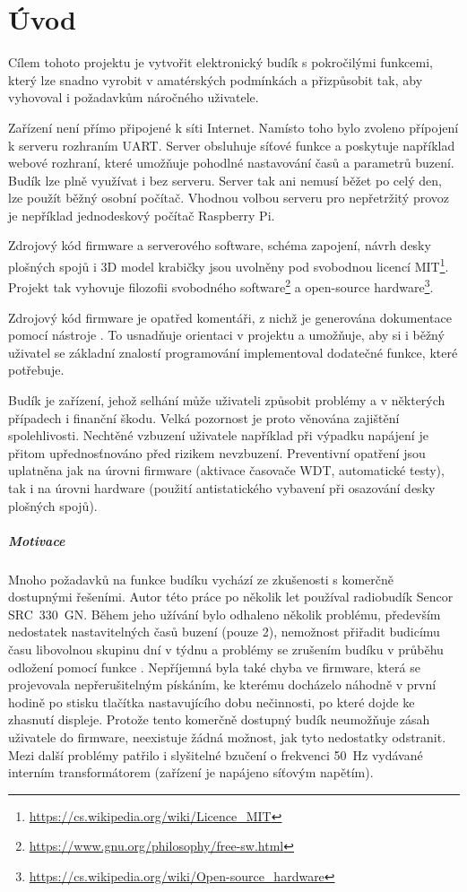 \chapter{Úvod}
Cílem tohoto projektu je vytvořit elektronický budík s pokročilými funkcemi,
který lze snadno vyrobit v amatérských podmínkách a přizpůsobit tak, aby
vyhovoval i požadavkům náročného uživatele.

Zařízení není přímo připojené k síti Internet. Namísto toho bylo zvoleno
přípojení k serveru rozhraním UART. Server obsluhuje síťové funkce a poskytuje
například webové rozhraní, které umožňuje pohodlné nastavování časů a parametrů
buzení. Budík lze plně využívat i bez serveru. Server tak ani nemusí běžet po
celý den, lze použít běžný osobní počítač. Vhodnou volbou serveru pro
nepřetržitý provoz je nepříklad jednodeskový počítač Raspberry Pi.

Zdrojový kód firmware a serverového software, schéma zapojení, návrh desky
plošných spojů i 3D model krabičky jsou uvolněny pod svobodnou
licencí MIT\footnote{\url{https://cs.wikipedia.org/wiki/Licence_MIT}}.
Projekt tak vyhovuje filozofii svobodného
software\footnote{\url{https://www.gnu.org/philosophy/free-sw.html}}
a open-source
hardware\footnote{\url{https://cs.wikipedia.org/wiki/Open-source_hardware}}.

Zdrojový kód firmware je opatřed komentáři, z nichž je generována dokumentace
pomocí nástroje . To usnadňuje orientaci v projektu
a umožňuje, aby si i běžný uživatel se základní znalostí programování
implementoval dodatečné funkce, které potřebuje.

Budík je zařízení, jehož selhání může uživateli způsobit problémy a v některých
případech i finanční škodu. Velká pozornost je proto věnována zajištění
spolehlivosti. Nechtěné vzbuzení uživatele například při výpadku napájení je
přitom upřednosťnováno před rizikem nevzbuzení. Preventivní opatření jsou
uplatněna jak na úrovni firmware (aktivace časovače \acs{WDT}, automatické
testy), tak i na úrovni hardware (použití antistatického vybavení při osazování
desky plošných spojů).

\paragraph{Motivace}
Mnoho požadavků na funkce budíku vychází ze zkušenosti s komerčně dostupnými
řešeními. Autor této práce po několik let používal radiobudík Sencor
SRC~330~GN. Během jeho užívání bylo odhaleno několik problému, především
nedostatek nastavitelných časů buzení (pouze 2), nemožnost přiřadit budicímu
času libovolnou skupinu dní v týdnu a problémy se zrušením budíku v průběhu
odložení pomocí funkce . Nepříjemná byla také chyba ve firmware,
která se projevovala nepřerušitelným pískáním, ke kterému docházelo náhodně
v první hodině po stisku tlačítka nastavujícího dobu nečinnosti, po které dojde
ke zhasnutí displeje. Protože tento komerčně dostupný budík neumožňuje zásah
uživatele do firmware, neexistuje žádná možnost, jak tyto nedostatky odstranit.
Mezi další problémy patřilo i slyšitelné bzučení o frekvenci \SI{50}{\hertz}
vydávané interním transformátorem (zařízení je napájeno síťovým napětím).

